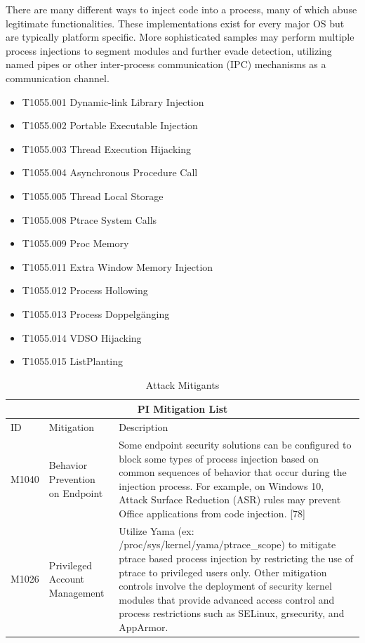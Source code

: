 \documentclass{article}
\begin{document}
There are many different ways to inject code into a process, many of which abuse legitimate functionalities. These implementations exist for every major OS but are typically platform specific. 
More sophisticated samples may perform multiple process injections to segment modules and further evade detection, utilizing named pipes or other inter-process communication (IPC) mechanisms as a communication channel. 

\begin{itemize}
\item T1055.001	Dynamic-link Library Injection
\item T1055.002	Portable Executable Injection
\item T1055.003	Thread Execution Hijacking
\item T1055.004	Asynchronous Procedure Call
\item T1055.005	Thread Local Storage
\item T1055.008	Ptrace System Calls
\item T1055.009	Proc Memory
\item T1055.011	Extra Window Memory Injection
\item T1055.012	Process Hollowing
\item T1055.013	Process Doppelgänging
\item T1055.014	VDSO Hijacking
\item T1055.015	ListPlanting
\end{itemize}


\begin{table}[h!]
  \centering
  \caption{Attack Mitigants \autocite{Mitre:2017}}
\begin{tabular}{ |p{1.2cm}||p{2cm}|p{11.5cm}|  }
  \hline
  \multicolumn{3}{|c|}{PI Mitigation List} \\
  \hline
  ID	& Mitigation & Description \\
  \hline
  M1040	& Behavior Prevention on Endpoint &	Some endpoint security solutions can be configured to block some types of
                                            process injection based on common sequences of behavior that occur during the
                                            injection process. For example, on Windows 10, Attack Surface Reduction (ASR)
                                            rules may prevent Office applications from code injection. [78] \\
  \hline
  M1026 & Privileged Account Management	& Utilize Yama (ex: /proc/sys/kernel/yama/ptrace\_scope) to mitigate ptrace based
                                          process injection by restricting the use of ptrace to privileged users only. Other
                                          mitigation controls involve the deployment of security kernel modules that provide
                                          advanced access control and process restrictions such as SELinux, grsecurity,
                                          and AppArmor. \\
  \hline
\end{tabular}
\label{table: Mitigations}
\end{table}
\end{document}
